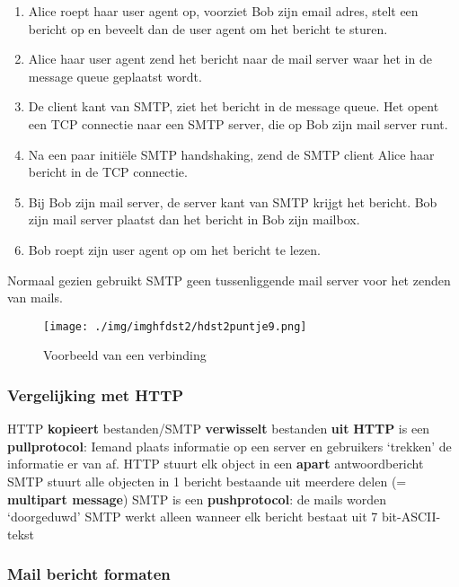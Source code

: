 \begin{enumerate}
 \item Alice roept haar user agent op, voorziet Bob zijn email adres, stelt een bericht op en beveelt dan de user agent om het bericht te sturen.
 \item Alice haar user agent zend het bericht naar de mail server waar het in de message queue geplaatst wordt.
 \item De client kant van SMTP, ziet het bericht in de message queue. Het opent een TCP connectie naar een SMTP server, die op Bob zijn mail server runt.
 \item Na een paar initiële SMTP handshaking, zend de SMTP client Alice haar bericht in de TCP connectie.
 \item Bij Bob zijn mail server, de server kant van SMTP krijgt het bericht. Bob zijn mail server plaatst dan het bericht in Bob zijn mailbox.
 \item Bob roept zijn user agent op om het bericht te lezen.
\end{enumerate}
Normaal gezien gebruikt SMTP geen tussenliggende mail server voor het zenden van mails.

\begin{figure}[h]
\centering
\texttt{[image: ./img/imghfdst2/hdst2puntje9.png]}
\caption{Voorbeeld van een verbinding }
\label{fig:verbinding}
\end{figure}

\subsubsection{Vergelijking met HTTP}


\bi
\itf HTTP \textbf{kopieert} bestanden/SMTP \textbf{verwisselt} bestanden \textbf{uit}
\itf \textbf{HTTP} is een \textbf{pullprotocol}: Iemand plaats informatie op een server en gebruikers ‘trekken’ de informatie er van af.
\itf HTTP stuurt elk object in een \textbf{apart} antwoordbericht
\itf SMTP stuurt alle objecten in 1 bericht bestaande uit meerdere delen (= \textbf{multipart message})
\itf SMTP is een \textbf{pushprotocol}: de mails worden ‘doorgeduwd’
\itf SMTP werkt alleen wanneer elk bericht bestaat uit 7 bit-ASCII-tekst
\ei

\clearpage

\subsubsection{Mail bericht formaten}

